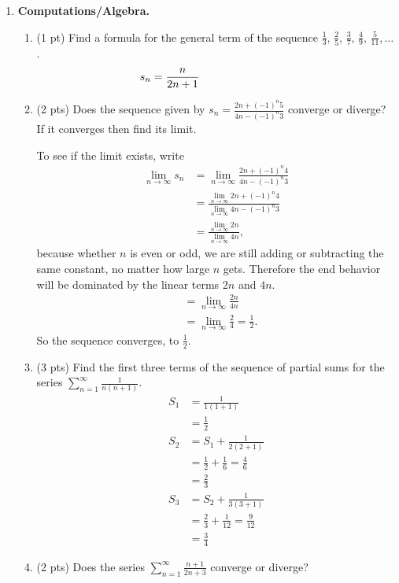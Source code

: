 \documentclass[11pt,letterpaper]{article}
\begin{document}
\begin{enumerate}
\begin{enumerate}
{\it -see the solution posted on the course website -}
\vspace{8pc}
\end{enumerate}

\vspace{1pc}

\item \textbf{Computations/Algebra.} 
 
\begin{enumerate}
\item (1 pt) Find a formula for the general term of the sequence $\frac{1}{3},\,\frac{2}{5},\,\frac{3}{7},\,\frac{4}{9},\,\frac{5}{11},\dots$.
\[s_n=\frac{n}{2n+1}\hspace{7pc}\]

\item (2 pts) Does the sequence given by $s_n=\frac{2n+(-1)^n5}{4n-(-1)^n3}$ converge or diverge?  If it converges then find its limit.

To see if the limit exists, write
\begin{align*}
\lim_{n\to\infty}s_n &= \lim_{n\to\infty}\frac{2n+(-1)^n4}{4n-(-1)^n3} \\
&= \frac{\lim_{n\to\infty}2n+(-1)^n4}{\lim_{n\to\infty}4n-(-1)^n3} \\
&= \frac{\lim_{n\to\infty}2n}{\lim_{n\to\infty}4n},
\end{align*}
because whether $n$ is even or odd, we are still adding or subtracting the same constant, no matter how large $n$ gets.  Therefore the end behavior will be dominated by the linear terms $2n$ and $4n$. 
\begin{align*}
&= \lim_{n\to\infty}\frac{2n}{4n} \\
&= \lim_{n\to\infty}\frac{2}{4}=\frac{1}{2}.
\end{align*}
So the sequence converges, to $\frac{1}{2}$.

\item (3 pts) Find the first three terms of the sequence of partial sums for the series $\sum_{n=1}^{\infty}\frac{1}{n(n+1)}$.
\begin{align*}
S_1 &=\frac{1}{1(1+1)} \\
&=\frac{1}{2} \\
S_2 &= S_1+\frac{1}{2(2+1)} \\
&= \frac{1}{2}+\frac{1}{6}=\frac{4}{6} \\
&= \frac{2}{3} \\
S_3 &=S_2+\frac{1}{3(3+1)} \\
&=\frac{2}{3}+\frac{1}{12} =\frac{9}{12} \\
&=\frac{3}{4}
\end{align*}
\item (2 pts) Does the series $\sum_{n=1}^{\infty}\frac{n+1}{2n+3}$ converge or diverge?


\end{enumerate}
\end{enumerate}
\end{document}
